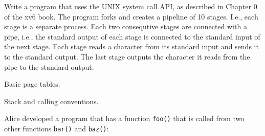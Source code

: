\documentclass[11pt]{exam}
\begin{document}
\begin{questions}
\begin{parts}
Write a program that uses the UNIX system call API, as described in Chapter 0
of the xv6 book. The program forks and creates a pipeline of 10 stages.
I.e., each stage is a separate process. Each two consequtive stages are
connected with a pipe, i.e., the standard output of each stage is connected to the 
standard input of the next stage. Each stage reads a character from its standard
input and sends it to the standard output. The last stage outputs the
character it reads from the pipe to the standard output. 


\vfill 


\end{parts} 

\addpoints

\newpage
\question Basic page tables.



\newpage \addpoints

\question Stack and calling conventions. 

Alice developed a program that has a function \texttt{foo()} that is called
from two other functions \texttt{bar()} and \texttt{baz()}:


\end{questions}
\end{document}
